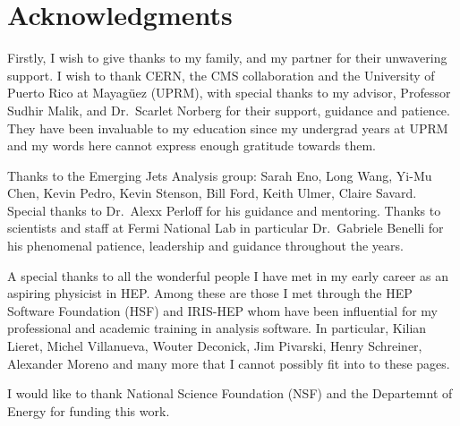 \chapter*{Acknowledgments}

Firstly, I wish to give thanks to my family, and my partner for their unwavering support.
I wish to thank CERN, the CMS collaboration and the University of Puerto Rico at Mayagüez (UPRM), with special thanks to my advisor, Professor Sudhir Malik, and Dr.~Scarlet Norberg for their support, guidance and patience. They have been invaluable to my education since my undergrad years at UPRM and my words here cannot express enough gratitude towards them.

Thanks to the Emerging Jets Analysis group: Sarah Eno, Long Wang, Yi-Mu Chen, Kevin Pedro, Kevin Stenson, Bill Ford, Keith Ulmer, Claire Savard. Special thanks to Dr.~Alexx Perloff for his guidance and mentoring. Thanks to scientists and staff at Fermi National Lab in particular Dr.~Gabriele Benelli for his phenomenal patience, leadership and guidance throughout the years.

A special thanks to all the wonderful people I have met in my early career as an aspiring physicist in HEP. Among these are those I met through the HEP Software Foundation (HSF) and IRIS-HEP whom have been influential for my professional and academic training in analysis software. In particular, Kilian Lieret, Michel Villanueva, Wouter Deconick, Jim Pivarski, Henry Schreiner, Alexander Moreno and many more that I cannot possibly fit into to these pages.

I would like to thank National Science Foundation (NSF) and the Departemnt of Energy for funding this work.
